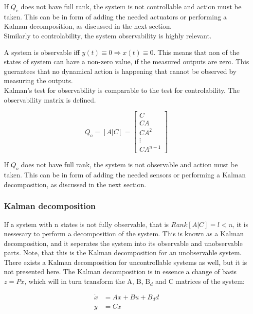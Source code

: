 If $Q_c$ does not have full rank, the system is not controllable and action must be taken. This can be in form of adding the needed actuators or performing a Kalman decomposition, as discussed in the next section.\\

Similarly to controlability, the system observability is highly relevant.

\noindent A system is observable iff $y(t) \equiv 0 \Rightarrow x(t) \equiv 0$. This means that non of the states of system can have a non-zero value, if the measured outputs are zero. This guerantees that no dynamical action is happening that cannot be observed by measuring the outputs.\\

Kalman's test for observability is comparable to the test for controlability. The observability matrix is defined.

\begin{equation}
	Q_o = [A|C] = \begin{bmatrix}
		C \\ CA \\ CA^2 \\ \vdots \\ CA^{n-1}
	\end{bmatrix}
\end{equation}

If $Q_o$ does not have full rank, the system is not observable and action must be taken. This can be in form of adding the needed sensors or performing a Kalman decomposition, as discussed in the next section.\\


\subsubsection{Kalman decomposition}
\label{sec:kalman}
If a system with n states is not fully observable, that is $Rank[A|C] = l < n$, it is nessesary to perform a decomposition of the system. This is known as a Kalman decomposition, and it seperates the system into its observable and unobservable parts. Note, that this is the Kalman decomposition for an unobservable system. There exists a Kalman decomposition for uncontrollable systems as well, but it is not presented here. The Kalman decomposition is in essence a change of basis $z=Px$, which will in turn transform the A, B, B$_d$ and C matrices of the system:


\begin{equation}
	\begin{split}
		\dot{x} & = Ax + Bu + B_dd \\
		y & = Cx
	\end{split}
\end{equation}

